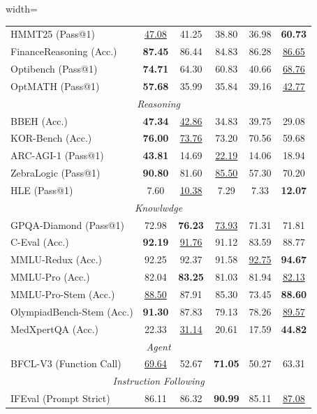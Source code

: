 \documentclass[table]{gtech}
\theoremstyle{definition}
\begin{document}
\begin{table}[t]
\begin{adjustbox}{width=\linewidth}
\begin{threeparttable}
\begin{tabular}{lccccc}
 HMMT25 (Pass@1) & \underline{47.08} & 41.25 & 38.80 & 36.98 & \textbf{60.73} \\
 FinanceReasoning (Acc.) & \textbf{87.45} & 86.44 & 84.83 & 86.28 & \underline{86.65} \\
 Optibench (Pass@1) & \textbf{74.71} & 64.30 & 60.83 & 40.66 & \underline{68.76} \\
 OptMATH (Pass@1) & \textbf{57.68} & 35.99 & 35.84 & 39.16 & \underline{42.77} \\
\midrule \multicolumn{6}{c}{\textit{Reasoning}} \\
\midrule BBEH (Acc.) & \textbf{47.34} & \underline{42.86} & 34.83 & 39.75 & 29.08 \\
 KOR-Bench (Acc.) & \textbf{76.00} & \underline{73.76} & 73.20 & 70.56 & 59.68 \\
 ARC-AGI-1 (Pass@1) & \textbf{43.81} & 14.69 & \underline{22.19} & 14.06 & 18.94 \\
 ZebraLogic (Pass@1) & \textbf{90.80} & 81.60 & \underline{85.50} & 57.30 & 70.20 \\
 HLE (Pass@1) & 7.60 & \underline{10.38} & 7.29 & 7.33 & \textbf{12.07} \\
\midrule \multicolumn{6}{c}{\textit{Knowlwdge}} \\
\midrule 
 GPQA-Diamond (Pass@1) & 72.98  & \textbf{76.23} & \underline{73.93} & 71.31 & 71.81 \\
C-Eval (Acc.) & \textbf{92.19} & \underline{91.76} & 91.12 & 83.59 & 88.77 \\
 MMLU-Redux (Acc.) & 92.25 & 92.37 & 91.58 & \underline{92.75} & \textbf{94.67} \\
 MMLU-Pro (Acc.) & 82.04 & \textbf{83.25} & 81.03 & 81.94 & \underline{82.13} \\
 MMLU-Pro-Stem (Acc.) & \underline{88.50} & 87.91 & 85.30 & 73.45 & \textbf{88.60} \\
 OlympiadBench-Stem (Acc.) & \textbf{91.30} & 87.83 & 79.13 & 78.26 & \underline{89.57} \\
MedXpertQA (Acc.) & 22.33 & \underline{31.14} & 20.61 & 17.59 & \textbf{44.82} \\	
\midrule \multicolumn{6}{c}{\textit{Agent}} \\
\midrule BFCL-V3 (Function Call) & \underline{69.64} & 52.67 & \textbf{71.05} & 50.27 & 63.31 \\
\midrule \multicolumn{6}{c}{\textit{Instruction Following}} \\
\midrule IFEval (Prompt Strict) & 86.11 & 86.32 & \textbf{90.99} & 85.11 & \underline{87.08} \\

\end{tabular}
\end{threeparttable}
\end{adjustbox}
\end{table}
\end{document}
